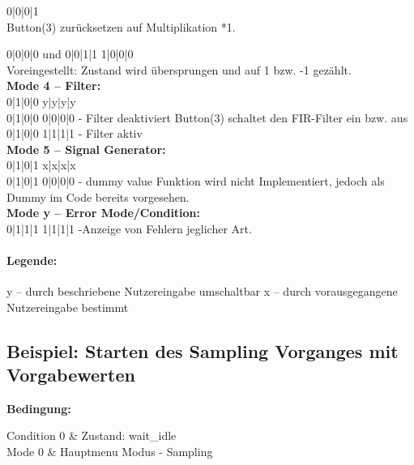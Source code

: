  {\color{orange}0|0|0|1} \\
\noindent Button(3) zurücksetzen auf Multiplikation *1.

 {\color{orange}0|0|0|0} und {\color{red} 0}{\color{blue}|0|1|1} {\color{orange}1|0|0|0} \\
Voreingestellt: Zustand wird übersprungen und auf 1 bzw. -1 gezählt.\\

\noindent \textbf{Mode 4 – Filter:}\\
{\color{red} 0}{\color{blue}|1|0|0} {\color{orange}y|y|y|y} \\
{\color{red} 0}{\color{blue}|1|0|0} {\color{orange}0|0|0|0} - Filter deaktiviert
Button(3) schaltet den FIR-Filter ein bzw. aus \\
{\color{red} 0}{\color{blue}|1|0|0} {\color{orange}1|1|1|1} - Filter aktiv\\

\noindent \textbf{Mode 5 – Signal Generator:}\\
{\color{red} 0}{\color{blue}|1|0|1} {\color{orange}x|x|x|x} \\
{\color{red} 0}{\color{blue}|1|0|1} {\color{orange}0|0|0|0} - dummy value
Funktion wird nicht Implementiert, jedoch als Dummy im Code bereits vorgesehen.\\

\noindent \textbf{Mode y – Error Mode/Condition:}\\
{\color{red} 0}{\color{blue}|1|1|1} {\color{orange}1|1|1|1} -Anzeige von Fehlern jeglicher Art. \\

\paragraph{Legende:}
y – durch beschriebene Nutzereingabe umschaltbar
x – durch vorausgegangene Nutzereingabe bestimmt

\newpage
\subsection{Beispiel: Starten des Sampling Vorganges mit Vorgabewerten}

\textbf{Bedingung:}
 
\noindent Condition 0 \&	Zustand: wait\_idle\\

\noindent Mode 0 \& 		Hauptmenu Modus - Sampling\\

